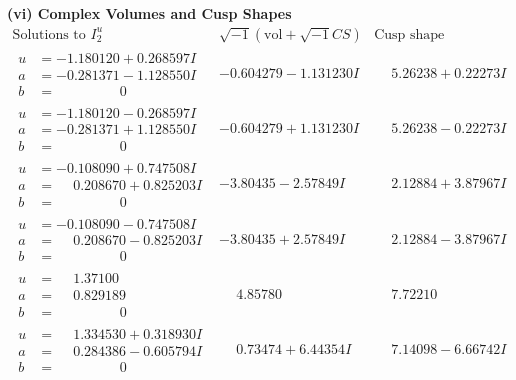 \documentclass[1p]{elsarticle_modified}
\theoremstyle{definition}
\newcommand{\I}{\sqrt{-1}}
\begin{document}
\newpage\flushleft \textbf{(vi) Complex Volumes and Cusp Shapes}
$$\begin{array}{c|c|c}  
\text{Solutions to }I^u_{2}& \I (\text{vol} + \sqrt{-1}CS) & \text{Cusp shape}\\
 \hline 
\begin{aligned}
u &= -1.180120 + 0.268597 I \\
a &= -0.281371 - 1.128550 I \\
b &= \phantom{-0.000000 } 0\end{aligned}
 & -0.604279 - 1.131230 I & \phantom{-}5.26238 + 0.22273 I \\ \hline\begin{aligned}
u &= -1.180120 - 0.268597 I \\
a &= -0.281371 + 1.128550 I \\
b &= \phantom{-0.000000 } 0\end{aligned}
 & -0.604279 + 1.131230 I & \phantom{-}5.26238 - 0.22273 I \\ \hline\begin{aligned}
u &= -0.108090 + 0.747508 I \\
a &= \phantom{-}0.208670 + 0.825203 I \\
b &= \phantom{-0.000000 } 0\end{aligned}
 & -3.80435 - 2.57849 I & \phantom{-}2.12884 + 3.87967 I \\ \hline\begin{aligned}
u &= -0.108090 - 0.747508 I \\
a &= \phantom{-}0.208670 - 0.825203 I \\
b &= \phantom{-0.000000 } 0\end{aligned}
 & -3.80435 + 2.57849 I & \phantom{-}2.12884 - 3.87967 I \\ \hline\begin{aligned}
u &= \phantom{-}1.37100\phantom{ +0.000000I} \\
a &= \phantom{-}0.829189\phantom{ +0.000000I} \\
b &= \phantom{-0.000000 } 0\end{aligned}
 & \phantom{-}4.85780\phantom{ +0.000000I} & \phantom{-}7.72210\phantom{ +0.000000I} \\ \hline\begin{aligned}
u &= \phantom{-}1.334530 + 0.318930 I \\
a &= \phantom{-}0.284386 - 0.605794 I \\
b &= \phantom{-0.000000 } 0\end{aligned}
 & \phantom{-}0.73474 + 6.44354 I & \phantom{-}7.14098 - 6.66742 I \\ \hline\begin{aligned}

\end{aligned}
\end{array}$$
\end{document}
